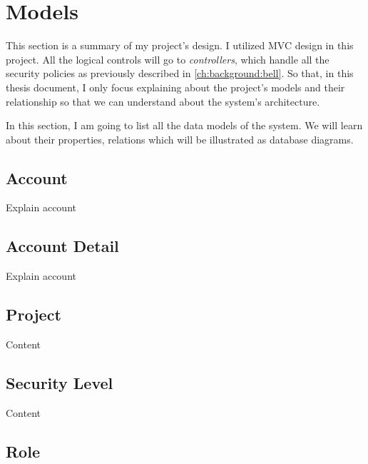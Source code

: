 
\section{Models}

This section is a summary of my project's design.
I utilized MVC design in this project.
All the logical controls will go to \emph{controllers}, which handle all the security policies as previously described in \autoref{ch:background:bell}.
So that, in this thesis document, I only focus explaining about the project's models and their relationship so that we can understand about the system's architecture.

In this section, I am going to list all the data models of the system.
We will learn about their properties, relations which will be illustrated as database diagrams.


\subsection{Account}

Explain account


\subsection{Account Detail}

Explain account


\subsection{Project}

Content


\subsection{Security Level}

Content


\subsection{Role}

